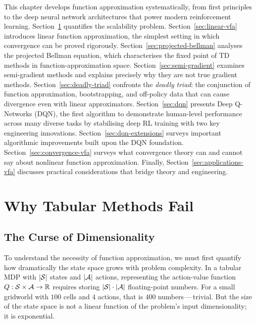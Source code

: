 This chapter develops function approximation systematically, from first principles to the deep
neural network architectures that power modern reinforcement learning.  Section~\ref{sec:tabular-fail}
quantifies the scalability problem.  Section~\ref{sec:linear-vfa} introduces linear function
approximation, the simplest setting in which convergence can be proved rigorously.
Section~\ref{sec:projected-bellman} analyses the projected Bellman equation, which characterises
the fixed point of TD methods in function-approximation space.
Section~\ref{sec:semi-gradient} examines semi-gradient methods and explains precisely why they are
not true gradient methods.  Section~\ref{sec:deadly-triad} confronts the \emph{deadly triad}: the
conjunction of function approximation, bootstrapping, and off-policy data that can cause divergence
even with linear approximators.  Section~\ref{sec:dqn} presents Deep Q-Networks (DQN), the first
algorithm to demonstrate human-level performance across many diverse tasks by stabilising deep RL
training with two key engineering innovations.  Section~\ref{sec:dqn-extensions} surveys important
algorithmic improvements built upon the DQN foundation.  Section~\ref{sec:convergence-vfa} surveys
what convergence theory can and cannot say about nonlinear function approximation.  Finally,
Section~\ref{sec:applications-vfa} discusses practical considerations that bridge theory and
engineering.

\section{Why Tabular Methods Fail}
\label{sec:tabular-fail}

\subsection{The Curse of Dimensionality}

To understand the necessity of function approximation, we must first quantify how dramatically the
state space grows with problem complexity.  In a tabular MDP with $|\mathcal{S}|$ states and $|\mathcal{A}|$
actions, representing the action-value function $Q : \mathcal{S} \times \mathcal{A} \to \mathbb{R}$ requires storing
$|\mathcal{S}| \cdot |\mathcal{A}|$ floating-point numbers.  For a small gridworld with $100$ cells and $4$ actions,
that is $400$ numbers\,---\,trivial.  But the size of the state space is not a linear function of
the problem's input dimensionality; it is exponential.

